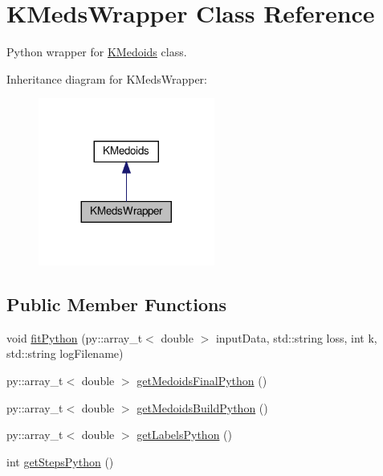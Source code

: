 \hypertarget{classKMedsWrapper}{}\section{K\+Meds\+Wrapper Class Reference}
\label{classKMedsWrapper}


Python wrapper for \hyperlink{classKMedoids}{K\+Medoids} class.  




Inheritance diagram for K\+Meds\+Wrapper\+:\nopagebreak
\begin{figure}[H]
\begin{center}
\leavevmode
\includegraphics[width=164pt]{classKMedsWrapper__inherit__graph}
\end{center}
\end{figure}
\subsection*{Public Member Functions}
\begin{DoxyCompactItemize}
\item 
void \hyperlink{classKMedsWrapper_a84e7535d6cdd70187c774811a210adc6}{fit\+Python} (py\+::array\+\_\+t$<$ double $>$ input\+Data, std\+::string loss, int k, std\+::string log\+Filename)
\item 
py\+::array\+\_\+t$<$ double $>$ \hyperlink{classKMedsWrapper_ae825241c43b8bf92912eb59cd12ae1c5}{get\+Medoids\+Final\+Python} ()
\item 
py\+::array\+\_\+t$<$ double $>$ \hyperlink{classKMedsWrapper_af272debff6f3b31490d20b8dc7bec322}{get\+Medoids\+Build\+Python} ()
\item 
py\+::array\+\_\+t$<$ double $>$ \hyperlink{classKMedsWrapper_aba0a92e75230b7853fd533657ead656e}{get\+Labels\+Python} ()
\item 
int \hyperlink{classKMedsWrapper_a25ac2830354eeae7963cdec34d0137e8}{get\+Steps\+Python} ()
\end{DoxyCompactItemize}


